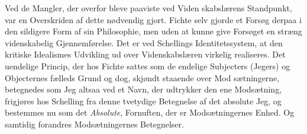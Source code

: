 \documentclass[12pt,a4paper]{book}
\begin{document}
Ved de Mangler, der overfor bleve paaviste ved Viden\-%
skabslærens Standpunkt, var en Overskriden af dette nødvendig\-%
gjort. Fichte selv gjorde et Forsøg derpaa i den sildigere
Form af sin Philosophie, men uden at kunne give Forsøget en
stræng videnskabelig Gjennemførelse. Det er ved Schellings
Identitetssystem, at den kritiske Idealismes Udvikling ud over
Videnskabslæren virkelig realiseres. Det uendelige Princip,
der hos Fichte sattes som de endelige Subjecters (Jegers) og
Objecternes fælleds Grund og dog, skjøndt staaende over Mod\-%
sætningerne, betegnedes som Jeg altsaa ved et Navn, der
udtrykker den ene Modsætning, frigjøres hos Schelling fra
denne tvetydige Betegnelse af det absolute Jeg, og bestemmes
nu som det \emph{Absolute}, Fornuften, der er Modsætningernes
Enhed. Og samtidig forandres Modsætningernes Betegnelser.
\end{document}
